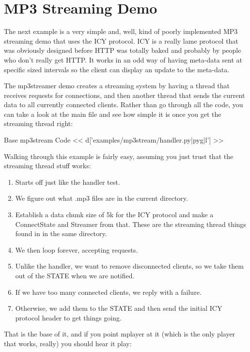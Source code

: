 \section{MP3 Streaming Demo}

The next example is a very simple and, well, kind of poorly implemented
MP3 streaming demo that uses the ICY protocol.  ICY is a really lame
protocol that was obviously designed before HTTP was totally baked
and probably by people who don't really get HTTP.  It works in an odd
way of having meta-data sent at specific sized intervals so the
client can display an update to the meta-data.

The mp3streamer demo creates a streaming system by
having a thread that receives requests for connections, and then
another thread that sends the current data to all currently connected
clients.  Rather than go through all the code, you can take a look
at the main file and see how simple it is once you get the
streaming thread right:

\begin{code}{Base mp3stream Code}
<< d['examples/mp3stream/handler.py|pyg|l'] >>
\end{code}

Walking through this example is fairly easy, assuming you just trust
that the streaming thread stuff works:

\begin{enumerate}
\item Starts off just like the handler test.
\item We figure out what .mp3 files are in the current directory.
\item Establish a data chunk size of 5k for the ICY protocol and
    make a ConnectState and Streamer from that.  These are the
    streaming thread things found in  in the same
    directory.
\item We then loop forever, accepting requests.
\item Unlike the handler, we want to remove disconnected clients,
    so we take them out of the STATE when we are notified.
\item If we have too many connected clients, we reply with a failure.
\item Otherwise, we add them to the STATE and then send the initial
    ICY protocol header to get things going.
\end{enumerate}


That is the base of it, and if you point mplayer at it (which is
the only player that works, really) you should hear it play:

